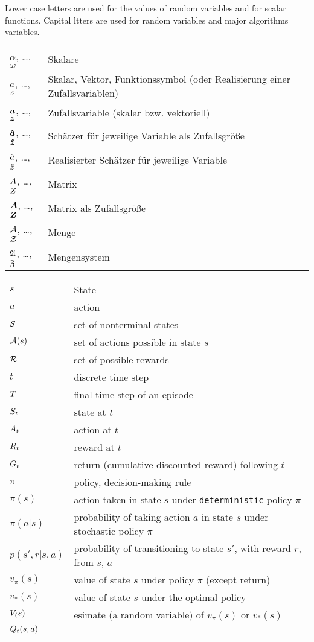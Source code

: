 Lower case letters are used for the values of random variables and for scalar functions. Capital ltters are used for random variables and major algorithms variables.

\begin{tabular}{p{1.5cm} p{12cm}}
$\alpha$, \dots, $\omega$ & Skalare \\
$a$, \dots, $z$ & Skalar, Vektor, Funktionssymbol (oder Realisierung einer Zufallsvariablen) \\
$\boldsymbol{a}$, \dots, $\boldsymbol{z}$ & Zufallsvariable (skalar bzw. vektoriell) \\
$\boldsymbol{\hat{a}}$, \dots, $\boldsymbol{\hat{z}}$ & Schätzer für jeweilige Variable als Zufallsgröße \\
$\hat{a}$, \dots, $\hat{z}$ & Realisierter Schätzer für jeweilige Variable \\
$A$, \dots, $Z$ & Matrix \\
$\boldsymbol{A}$, \dots, $\boldsymbol{Z}$ & Matrix als Zufallsgröße\\
$\mathcal{A}$, \dots, $\mathcal{Z}$ & Menge \\
$\mathfrak{A}$, \dots, $\mathfrak{Z}$ & Mengensystem \\
\end{tabular}


\begin{tabular}{p{1.5cm} p{12cm}}
$s$ & State \\
$a$ & action \\
$\mathcal{S}$ & set of nonterminal states \\
$\mathcal{A}(s)$ & set of actions possible in state $s$ \\
$\mathcal{R}$ & set of possible rewards \\

$t$ & discrete time step \\
$T$ & final time step of an episode \\
$S_t$ & state at $t$ \\
$A_t$ & action at $t$ \\
$R_t$ & reward at $t$ \\
$G_t$ & return (cumulative discounted reward) following $t$ \\
$\pi$ & policy, decision-making rule \\
$\pi(s)$ & action taken in state $s$ under \texttt{deterministic} policy $\pi$ \\
$\pi(a|s)$ & probability of taking action $a$ in state $s$ under stochastic policy $\pi$ \\
$p(s',r|s, a)$ & probability of transitioning to state $s'$, with reward $r$, from $s$, $a$ \\

$v_\pi(s)$ & value of state $s$ under policy $\pi$ (except return) \\
$v_*(s)$ & value of state $s$ under the optimal policy \\
$V_(s)$ & esimate (a random variable) of $v_\pi(s)$ or $v_*(s)$ \\ 
$Q_t(s, a)$ & 


\end{tabular}

